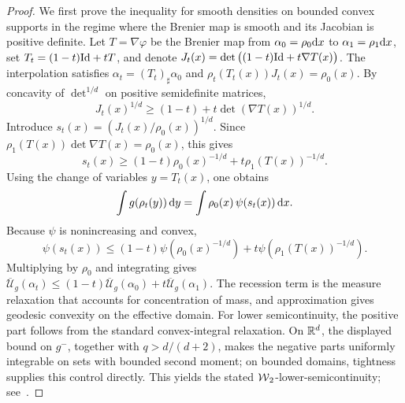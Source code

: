 \begin{proof}
	We first prove the inequality for smooth densities on bounded convex supports in the regime where the Brenier map is smooth and its Jacobian is positive definite. Let \(T=\nabla\varphi\) be the Brenier map from \(\alpha_0=\rho_0\mathrm{d} x\) to \(\alpha_1=\rho_1\mathrm{d} x\), set \(T_t=(1-t)\mathrm{Id}+tT\), and denote
	\(J_t(x)=\det\big((1-t)\mathrm{Id}+t\nabla T(x)\big)\).
	The interpolation satisfies \(\alpha_t=(T_t)_\sharp\alpha_0\) and
	\(\rho_t(T_t(x))J_t(x)=\rho_0(x)\).
	By concavity of \(\det^{1/d}\) on positive semidefinite matrices,
	\[
		J_t(x)^{1/d}\geq (1-t)+t\det(\nabla T(x))^{1/d}.
	\]
	Introduce \(s_t(x)=(J_t(x)/\rho_0(x))^{1/d}\). Since
	\(\rho_1(T(x))\det\nabla T(x)=\rho_0(x)\), this gives
	\[
		s_t(x)\geq (1-t)\rho_0(x)^{-1/d}+t\rho_1(T(x))^{-1/d}.
	\]
	Using the change of variables \(y=T_t(x)\), one obtains
	\[
		\int g(\rho_t(y))\,\mathrm{d} y
		=\int \rho_0(x)\,\psi(s_t(x))\,\mathrm{d} x.
	\]
	Because \(\psi\) is nonincreasing and convex,
	\[
		\psi(s_t(x))
		\leq (1-t)\psi(\rho_0(x)^{-1/d})+t\psi(\rho_1(T(x))^{-1/d}).
	\]
	Multiplying by \(\rho_0\) and integrating gives
	\(\overline{\mathcal U}_g(\alpha_t)\leq(1-t)\overline{\mathcal U}_g(\alpha_0)+t\overline{\mathcal U}_g(\alpha_1)\).
	The recession term is the measure relaxation that accounts for concentration of mass, and approximation gives geodesic convexity on the effective domain. For lower semicontinuity, the positive part follows from the standard convex-integral relaxation. On \(\mathbb{R}^d\), the displayed bound on \(g^-\), together with \(q>d/(d+2)\), makes the negative parts uniformly integrable on sets with bounded second moment; on bounded domains, tightness supplies this control directly. This yields the stated \(\operatorname{\mathcal{W}}_2\)-lower-semicontinuity; see~\citet{mccann1997convexity,ambrosio2006gradient}.
\end{proof}

